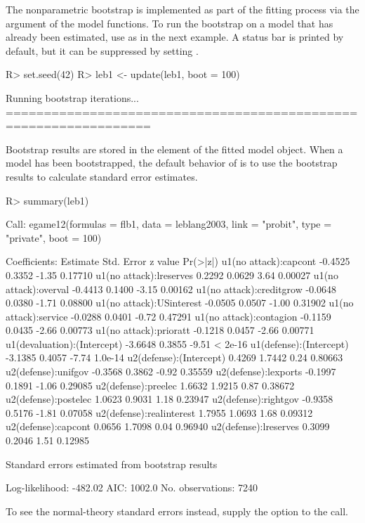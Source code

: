 \documentclass[article]{jss}
\begin{document}
The nonparametric bootstrap is implemented as part of the fitting process via
the  argument of the model functions.  To run the bootstrap on a
model that has already been estimated, use  as in the next example.
A status bar is printed by default, but it can be suppressed by setting
.
\begin{Schunk}
\begin{Sinput}
R> set.seed(42)
R> leb1 <- update(leb1, boot = 100)
\end{Sinput}
\end{Schunk}
\begin{Code}
Running bootstrap iterations...
=================================================================
\end{Code}
Bootstrap results are stored in the  element of the fitted
model object.  When a model has been bootstrapped, the default behavior of
 is to use the bootstrap results to calculate standard error
estimates.
\begin{Schunk}
\begin{Sinput}
R> summary(leb1)
\end{Sinput}
\begin{Soutput}
Call:
egame12(formulas = flb1, data = leblang2003, link = "probit", 
    type = "private", boot = 100)

Coefficients:
                            Estimate Std. Error z value Pr(>|z|)
u1(no attack):capcont        -0.4525     0.3352   -1.35  0.17710
u1(no attack):lreserves       0.2292     0.0629    3.64  0.00027
u1(no attack):overval        -0.4413     0.1400   -3.15  0.00162
u1(no attack):creditgrow     -0.0648     0.0380   -1.71  0.08800
u1(no attack):USinterest     -0.0505     0.0507   -1.00  0.31902
u1(no attack):service        -0.0288     0.0401   -0.72  0.47291
u1(no attack):contagion      -0.1159     0.0435   -2.66  0.00773
u1(no attack):prioratt       -0.1218     0.0457   -2.66  0.00771
u1(devaluation):(Intercept)  -3.6648     0.3855   -9.51  < 2e-16
u1(defense):(Intercept)      -3.1385     0.4057   -7.74  1.0e-14
u2(defense):(Intercept)       0.4269     1.7442    0.24  0.80663
u2(defense):unifgov          -0.3568     0.3862   -0.92  0.35559
u2(defense):lexports         -0.1997     0.1891   -1.06  0.29085
u2(defense):preelec           1.6632     1.9215    0.87  0.38672
u2(defense):postelec          1.0623     0.9031    1.18  0.23947
u2(defense):rightgov         -0.9358     0.5176   -1.81  0.07058
u2(defense):realinterest      1.7955     1.0693    1.68  0.09312
u2(defense):capcont           0.0656     1.7098    0.04  0.96940
u2(defense):lreserves         0.3099     0.2046    1.51  0.12985

Standard errors estimated from bootstrap results

Log-likelihood: -482.02
AIC: 1002.0
No. observations: 7240 
\end{Soutput}
\end{Schunk}
To see the normal-theory standard errors instead, supply the option
 to the  call.
\end{document}
